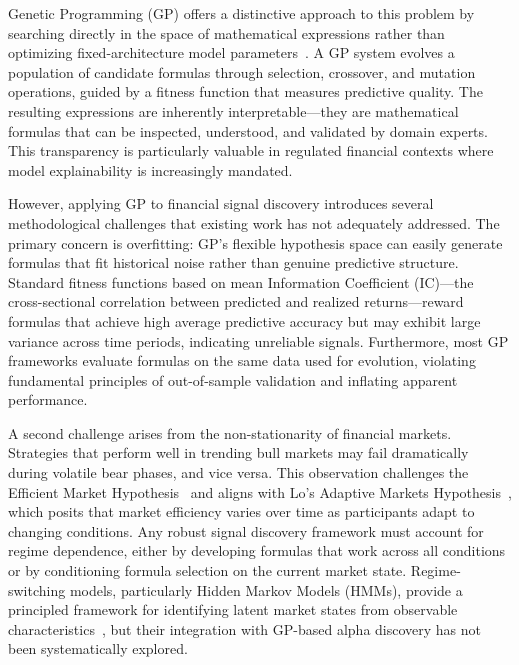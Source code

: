 \documentclass{ieeeaccess}
\begin{document}
Genetic Programming (GP) offers a distinctive approach to this problem by searching directly in the space of mathematical expressions rather than optimizing fixed-architecture model parameters~\cite{b6}. A GP system evolves a population of candidate formulas through selection, crossover, and mutation operations, guided by a fitness function that measures predictive quality. The resulting expressions are inherently interpretable---they are mathematical formulas that can be inspected, understood, and validated by domain experts. This transparency is particularly valuable in regulated financial contexts where model explainability is increasingly mandated.

However, applying GP to financial signal discovery introduces several methodological challenges that existing work has not adequately addressed. The primary concern is overfitting: GP's flexible hypothesis space can easily generate formulas that fit historical noise rather than genuine predictive structure. Standard fitness functions based on mean Information Coefficient (IC)---the cross-sectional correlation between predicted and realized returns---reward formulas that achieve high average predictive accuracy but may exhibit large variance across time periods, indicating unreliable signals. Furthermore, most GP frameworks evaluate formulas on the same data used for evolution, violating fundamental principles of out-of-sample validation and inflating apparent performance.

A second challenge arises from the non-stationarity of financial markets. Strategies that perform well in trending bull markets may fail dramatically during volatile bear phases, and vice versa. This observation challenges the Efficient Market Hypothesis~\cite{b24} and aligns with Lo's Adaptive Markets Hypothesis~\cite{b25}, which posits that market efficiency varies over time as participants adapt to changing conditions. Any robust signal discovery framework must account for regime dependence, either by developing formulas that work across all conditions or by conditioning formula selection on the current market state. Regime-switching models, particularly Hidden Markov Models (HMMs), provide a principled framework for identifying latent market states from observable characteristics~\cite{b7}, but their integration with GP-based alpha discovery has not been systematically explored.
\end{document}
